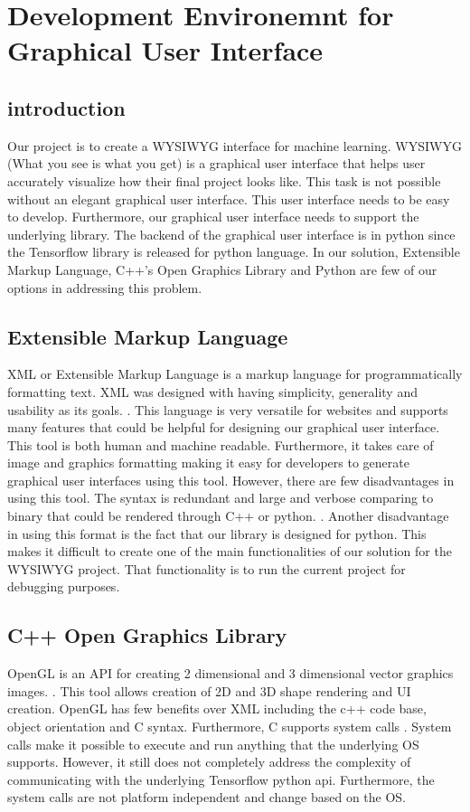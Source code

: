 \documentclass[journal,10pt,onecolumn,compsoc]{IEEEtran} \usepackage[margin=1.0in]{geometry} \usepackage{pdfpages} \usepackage{graphicx}
\begin{document}
\section{Development Environemnt for Graphical User Interface}
\subsection{introduction}
Our project is to create a WYSIWYG interface for machine learning. 
WYSIWYG (What you see is what you get) is a graphical user interface that helps user accurately visualize how their final project looks like. 
This task is not possible without an elegant graphical user interface. 
This user interface needs to be easy to develop. 
Furthermore, our graphical user interface needs to support the underlying library. 
The backend of the graphical user interface is in python since the Tensorflow library is released for python language. 
In our solution, Extensible Markup Language, C++’s Open Graphics Library and Python are few of our options in addressing this problem.

\subsection{Extensible Markup Language}
XML or Extensible Markup Language is a markup language for programmatically formatting text. 
XML was designed with having simplicity, generality and usability as its goals. \cite{xmlf}. 
This language is very versatile for websites and supports many features that could be helpful for designing our graphical user interface. 
This tool is both human and machine readable. 
Furthermore, it takes care of image and graphics formatting making it easy for developers to generate graphical user interfaces using this tool. 
However, there are few disadvantages in using this tool. 
The syntax is redundant and large and verbose comparing to binary that could be rendered through C++ or python. \cite{xmls}. 
Another disadvantage in using this format  is the fact that our library is designed for python. 
This makes it difficult to create one of the main functionalities of our solution for the WYSIWYG project. 
That functionality is to run the current project for debugging purposes.

\subsection{C++ Open Graphics Library}
OpenGL is an API for creating 2 dimensional and 3 dimensional vector graphics images. \cite{opengl}. 
This tool allows creation of 2D and 3D shape rendering and UI creation. 
OpenGL has few benefits over XML including the c++ code base, object orientation and C syntax. 
Furthermore, C supports system calls . 
System calls make it possible to execute and run anything that the underlying OS supports. 
However, it still does not completely address the complexity of communicating with the underlying Tensorflow python api. 
Furthermore, the system calls are not platform independent and change based on the OS.
\end{document}
